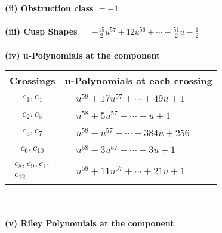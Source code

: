 \documentclass[1p]{elsarticle_modified}
\theoremstyle{definition}
\begin{document}
\flushleft \textbf{(ii) Obstruction class $= -1$}\\~\\
\flushleft \textbf{(iii) Cusp Shapes $= -\frac{15}{2} u^{57}+12 u^{56}+\cdots-\frac{51}{2} u-\frac{1}{2}$}\\~\\
\newpage\renewcommand{\arraystretch}{1}
\flushleft \textbf{(iv) u-Polynomials at the component}\newline \\
\begin{tabular}{m{50pt}|m{274pt}}
Crossings & \hspace{64pt}u-Polynomials at each crossing \\
\hline $$\begin{aligned}c_{1},c_{4}\end{aligned}$$&$\begin{aligned}
&u^{58}+17 u^{57}+\cdots+49 u+1
\end{aligned}$\\
\hline $$\begin{aligned}c_{2},c_{5}\end{aligned}$$&$\begin{aligned}
&u^{58}+5 u^{57}+\cdots+u+1
\end{aligned}$\\
\hline $$\begin{aligned}c_{3},c_{7}\end{aligned}$$&$\begin{aligned}
&u^{58}- u^{57}+\cdots+384 u+256
\end{aligned}$\\
\hline $$\begin{aligned}c_{6},c_{10}\end{aligned}$$&$\begin{aligned}
&u^{58}-3 u^{57}+\cdots-3 u+1
\end{aligned}$\\
\hline $$\begin{aligned}c_{8},c_{9},c_{11}\\c_{12}\end{aligned}$$&$\begin{aligned}
&u^{58}+11 u^{57}+\cdots+21 u+1
\end{aligned}$\\
\hline
\end{tabular}\\~\\
\newpage\renewcommand{\arraystretch}{1}
\flushleft \textbf{(v) Riley Polynomials at the component}\newline \\
\end{document}
